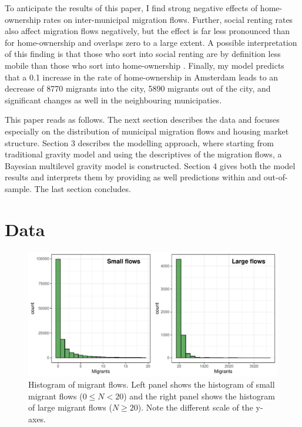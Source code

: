 \documentclass[fleqn,10pt]{SelfArx} %
\begin{document}
        To anticipate the results of this paper, I find strong negative effects
        of home-ownership rates on inter-municipal migration flows. Further,
        social renting rates also affect migration flows negatively, but the
        effect is far less pronounced than for home-ownership and overlaps zero
        to a large extent. A possible interpretation of this finding is that
        those who sort into social renting are by definition less mobile than
        those who sort into home-ownership \citep[this argument is put forward
        by][as well]{boyle1998migration}. Finally, my model predicts that a 0.1
        increase in the rate of home-ownership in Amsterdam leads to an decrease
        of 8770 migrants into the city, 5890 migrants out of the city, and
        significant changes as well in the neighbouring municipaties.

        This paper reads as follows. The next section describes the data and
        focuses especially on the distribution of municipal migration flows and
        housing market structure. Section 3 describes the modelling
        approach, where starting from traditional gravity model and using the
        descriptives of the migration flows, a Bayesian multilevel gravity model
        is constructed. Section 4 gives both the model results and interprets
        them by providing as well predictions within and out-of-sample. The last
        section concludes.
        
        \section{Data}

        \begin{figure}[t!]\centering %
          \includegraphics[width=0.8\linewidth]{../fig/hist_mig.pdf}
          \caption{Histogram of migrant flows. Left panel shows the
            histogram of small migrant flows ($0 \leq N < 20$) and the right
            panel shows the histogram of large migrant flows
            ($N \geq 20$). Note the different scale of the y-axes.}
          \label{fig:hist_mig}
        \end{figure}
\end{document}

